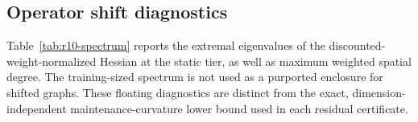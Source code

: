 \subsection{Operator shift diagnostics}
Table~\ref{tab:r10-spectrum} reports the extremal eigenvalues of the discounted-weight-normalized Hessian at the static tier, as well as maximum weighted spatial degree. The training-sized spectrum is not used as a purported enclosure for shifted graphs. These floating diagnostics are distinct from the exact, dimension-independent maintenance-curvature lower bound used in each residual certificate.


